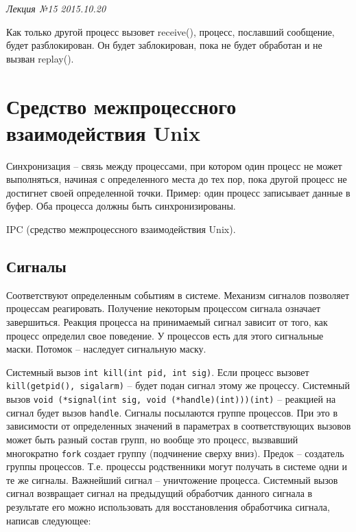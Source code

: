\clearpage
\begin{flushright}
    \textit{Лекция №15}
    \textit{2015.10.20}
\end{flushright}

Как только другой процесс вызовет receive(), процесс, пославший сообщение, будет разблокирован. Он будет заблокирован, пока не будет обработан и не вызван replay().

\chapter{Средство межпроцессного взаимодействия Unix}
Синхронизация – связь между процессами, при котором один процесс не может выполняться, начиная с определенного места до тех пор, пока другой процесс не достигнет своей определенной точки. Пример: один процесс записывает данные в буфер. Оба процесса должны быть синхронизированы.

IPC (средство межпроцессного взаимодействия Unix). 

\section{Сигналы}

Соответствуют определенным событиям в системе. Механизм сигналов позволяет процессам реагировать. Получение некоторым процессом сигнала означает завершиться. Реакция процесса на принимаемый сигнал зависит от того, как процесс определил свое поведение. У процессов есть для этого сигнальные маски. Потомок – наследует сигнальную маску.

Системный вызов \verb|int kill(int pid, int sig)|. Если процесс вызовет \verb|kill(getpid(), sigalarm)| – будет подан сигнал этому же процессу. 
Системный вызов \verb|void (*signal(int sig, void (*handle)(int)))(int)| – реакцией на сигнал будет вызов \verb|handle|. Сигналы посылаются группе процессов. При это в зависимости от определенных значений в параметрах в соответствующих вызовов может быть разный состав групп, но вообще это процесс, вызвавший многократно \verb|fork| создает группу (подчинение сверху вниз). Предок – создатель группы процессов. Т.е. процессы родственники могут получать в системе одни и те же сигналы. Важнейший сигнал – уничтожение процесса. Системный вызов сигнал возвращает сигнал на предыдущий обработчик данного сигнала в результате его можно использовать для восстановления обработчика сигнала, написав следующее:

